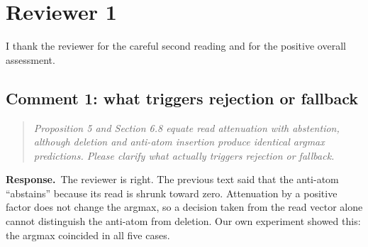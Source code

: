 \documentclass[11pt]{article}
\newenvironment{reviewer}{\par\medskip\noindent\begin{quote}\itshape}{\end{quote}}
\newcommand{\response}{\par\noindent\textbf{Response.}\ }
\begin{document}
\section*{Reviewer 1}

I thank the reviewer for the careful second reading and for the positive overall assessment.

\subsection*{Comment 1: what triggers rejection or fallback}

\begin{reviewer}
Proposition 5 and Section 6.8 equate read attenuation with abstention, although deletion and anti-atom insertion produce identical argmax predictions. Please clarify what actually triggers rejection or fallback.
\end{reviewer}

\response The reviewer is right. The previous text said that the anti-atom ``abstains'' because its read is shrunk toward zero. Attenuation by a positive factor does not change the argmax, so a decision taken from the read vector alone cannot distinguish the anti-atom from deletion. Our own experiment showed this: the argmax coincided in all five cases.
\end{document}
